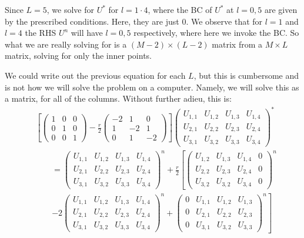 \documentclass[11pt]{article}
\def\f{\frac }
\begin{document}
\begin{enumerate}
Since $L = 5$, we solve for $U^{*}$ for $l = 1\cdot 4$, where the BC of $U^{*}$ at $l = 0, 5$ are given by the prescribed conditions.
Here, they are just 0.
We observe that for $l=1$ and $l=4$ the RHS $U^{n}$ will have $l=0,5$ respectively, where here we invoke the BC.
So what we are really solving for is a $(M-2) \times (L-2)$ matrix from a $M\times L$ matrix, solving for only the inner points.

We could write out the previous equation for each $L$, but this is cumbersome and is not how we will solve the problem on a computer.
Namely, we will solve this as a matrix, for all of the columns.
Without further adieu, this is:
\begin{align*} & \left [ \left ( \begin{array}{ccc} 1 & 0 & 0\\ 0 & 1 & 0\\ 0 & 0 & 1 \end{array} \right )  - \f{r}{2} \left ( \begin{array}{ccc} -2 & 1 & 0\\ 1 & -2 & 1\\ 0 & 1 & -2 \end{array} \right )\right ] \left ( \begin{array}{cccc} U_{1,1} & U_{1,2} & U_{1,3} & U_{1,4 }\\ U_{2,1} & U_{2,2} & U_{2,3} & U_{2,4 } \\ U_{3,1} & U_{3,2} & U_{3,3} & U_{3,4 }  \end{array} \right ) ^{*} \\
& ~~~~~~~~~= \left ( \begin{array}{cccc} U_{1,1} & U_{1,2} & U_{1,3} & U_{1,4 }\\ U_{2,1} & U_{2,2} & U_{2,3} & U_{2,4 } \\ U_{3,1} & U_{3,2} & U_{3,3} & U_{3,4 }  \end{array} \right ) ^{n} + \f{r}{2} \left [ \left ( \begin{array}{cccc} U_{1,2} & U_{1,3} & U_{1,4} & 0 \\ U_{2,2} & U_{2,3} & U_{2,4} & 0 \\ U_{3,2} & U_{3,2} & U_{3,4} & 0  \end{array} \right ) ^{n} \right.\\
& ~~~~~~~~~\left. -2\left ( \begin{array}{cccc} U_{1,1} & U_{1,2} & U_{1,3} & U_{1,4 }\\ U_{2,1} & U_{2,2} & U_{2,3} & U_{2,4 } \\ U_{3,1} & U_{3,2} & U_{3,3} & U_{3,4 }  \end{array} \right ) ^{n} + \left ( \begin{array}{cccc} 0 & U_{1,1} & U_{1,2} & U_{1,3 }\\ 0 & U_{2,1} & U_{2,2} & U_{2,3 } \\ 0 & U_{3,1} & U_{3,2} & U_{3,3 }  \end{array} \right ) ^{n} \right ]\end{align*}


\end{enumerate}
\end{document}
